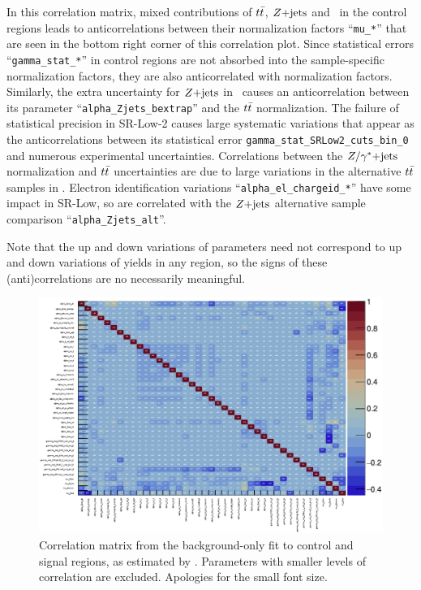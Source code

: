 In this correlation matrix, mixed contributions of $t\bar t$, $Z\mathrm{+jets}$ and
\diboson\ in the control regions leads to anticorrelations between their
normalization factors
``\texttt{mu\_*}'' that are seen in the bottom right corner of this correlation
plot.
Since statistical errors ``\texttt{gamma\_stat\_*}'' in control regions are not
absorbed into the sample-specific normalization factors, they are also
anticorrelated with normalization factors.
Similarly, the extra uncertainty for $Z\mathrm{+jets}$ in \crtt\ causes an
anticorrelation between its parameter ``\texttt{alpha\_Zjets\_bextrap}''
and the $t\bar t$ normalization.
The failure of statistical precision in SR-Low-2 causes large systematic
variations that appear as the anticorrelations between its statistical error
\texttt{gamma\_stat\_SRLow2\_cuts\_bin\_0} and numerous experimental
uncertainties.
Correlations between the $Z/\gamma^*\mathrm{+jets}$ normalization and $t\bar t$ uncertainties
are due to large variations in the alternative $t\bar t$ samples in \crdy.
Electron identification variations ``\texttt{alpha\_el\_chargeid\_*}'' have
some impact in SR-Low,  so are correlated with the $Z\mathrm{+jets}$ alternative sample
comparison ``\texttt{alpha\_Zjets\_alt}''.

Note that the up and down variations of parameters need not correspond to up
and down variations of yields in any region, so the signs of these
(anti)correlations are no necessarily meaningful.

\begin{figure}[tp]
\centering
\includegraphics[height=\textwidth,angle=90,origin=c]{figures/2ljets_fit_corrmatrix.pdf}
\caption[
Correlation matrix from the background-only fit to control and signal regions
]{%
Correlation matrix from the background-only fit to control and signal regions,
as estimated by \histfitter.
Parameters with smaller levels of correlation are excluded.
Apologies for the small font size.
}
\label{fig:2ljets_fit_corrmatrix}
\end{figure}

